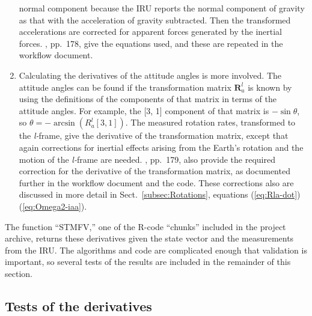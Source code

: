 \documentclass[12pt,twoside,english,12pt,twoside,english]{article}\usepackage[]{graphicx}\usepackage[]{color}
\let\OrgIndex\index
\renewcommand*{\index}[1]{\OrgIndex{#1}}
\begin{document}
\begin{enumerate}
normal component because the
IRU reports the normal
component of gravity as that with the acceleration of gravity subtracted.
Then the transformed accelerations are corrected for apparent forces
generated by the inertial forces. \citet{noureldin2013fundamentals},
pp.~178, give the equations used, and these are repeated
in the workflow document.
\item Calculating the derivatives of the
attitude angles is more involved.
The attitude angles can be found if the transformation
matrix $\mathbf{R}_{a}^{l}$
is known by using the definitions of the components of that matrix
in terms of the attitude angles. For example, the {[}3, 1{]} component
of that matrix is $-\sin\theta$, so $\theta=-\arcsin(R_{a}^{l}[3,1])$.
The measured
rotation rates, transformed
to the \emph{l-}frame,
give the derivative of the transformation matrix,
except that again corrections for inertial effects
arising from the Earth's rotation and
the motion
of the \emph{l-}frame are needed. \citet{noureldin2013fundamentals},
pp.~179, also provide the required correction for
the derivative of the transformation matrix, as documented further
in the workflow document and the code. These
corrections also are discussed in more detail in Sect.~\ref{subsec:Rotations},
equations (\ref{eq:Rla-dot})\textendash (\ref{eq:Omega2-iaa}).
\end{enumerate}
The function ``STMFV,''
one of the R-code ``chunks'' included in the project archive, returns
these  derivatives given the state
vector and the measurements from the
IRU\@. The algorithms and code are
complicated enough that validation is important, so several tests
of the results are included in the remainder of this section.

\subsection{Tests of the derivatives}
\end{document}
